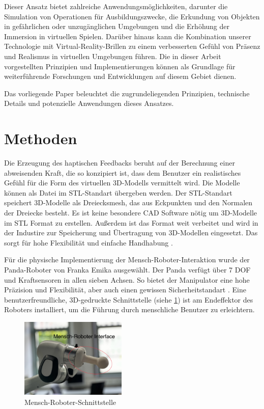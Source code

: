 \documentclass[conference]{IEEEtran}
\begin{document}
Dieser Ansatz bietet zahlreiche Anwendungsmöglichkeiten, darunter die Simulation von Operationen 
für Ausbildungszwecke, die Erkundung von Objekten in gefährlichen oder unzugänglichen Umgebungen und 
die Erhöhung der Immersion in virtuellen Spielen. Darüber hinaus kann die Kombination unserer Technologie 
mit Virtual-Reality-Brillen zu einem verbesserten Gefühl von Präsenz und Realismus in virtuellen Umgebungen führen. 
Die in dieser Arbeit vorgestellten Prinzipien und Implementierungen können als Grundlage für weiterführende 
Forschungen und Entwicklungen auf diesem Gebiet dienen.

Das vorliegende Paper beleuchtet die zugrundeliegenden Prinzipien, technische Details und potenzielle 
Anwendungen dieses Ansatzes.


\section{Methoden}
Die Erzeugung des haptischen Feedbacks beruht auf der Berechnung einer abweisenden Kraft, die so 
konzipiert ist, dass dem Benutzer ein realistisches Gefühl für die Form des virtuellen 3D-Modells 
vermittelt wird. Die Modelle können als Datei im STL-Standart übergeben werden. Der STL-Standart 
speichert 3D-Modelle als Dreiecksmesh, das aus Eckpunkten und den Normalen der Dreiecke besteht. 
Es ist keine besondere CAD Software nötig um 3D-Modelle im STL Format zu erstellen. Außerdem ist das 
Format weit verbeitet und wird in der Industire zur Speicherung und Übertragung von 3D-Modellen eingesetzt. 
Das sorgt für hohe Flexibilität und einfache Handhabung \autocite{WasIstSTLDatei2017}.

Für die physische Implementierung der Mensch-Roboter-Interaktion wurde der Panda-Roboter von 
Franka Emika ausgewählt. Der Panda verfügt über 7 DOF und Kraftsensoren in allen sieben Achsen. So bietet der 
Manipulator eine hohe 
Präzision und Flexibilität, aber auch einen gewissen Sicherheitstandart \cite{pandaDatasheet}. Eine benutzerfreundliche, 
3D-gedruckte Schnittstelle (siehe \ref{fig:MRinterface}) 
ist am Endeffektor des Roboters installiert, um die Führung durch menschliche Benutzer zu erleichtern.  

\begin{figure}
    \centering
    \includegraphics[width=0.45\textwidth]{pics/interface.jpeg}
    \caption{Mensch-Roboter-Schnittstelle}
    \label{fig:MRinterface}
\end{figure}
\end{document}
